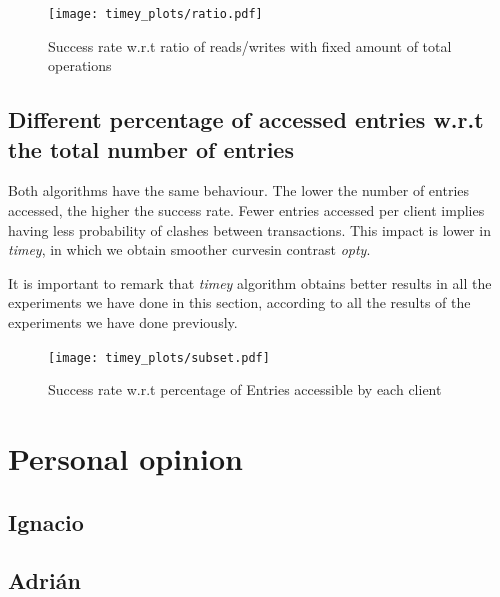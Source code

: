 \documentclass[a4paper, 10pt]{article}
\begin{document}
\begin{figure}[H]
  \centering
  \texttt{[image: timey\_plots/ratio.pdf]}
    \caption{Success rate w.r.t ratio of reads/writes with fixed amount of total operations}
    \label{timey:ratio}
\end{figure} 

\clearpage
\subsection{Different percentage of accessed entries w.r.t the total number of entries}

Both algorithms have the same behaviour. The lower the number of entries accessed, the higher the success rate. Fewer entries accessed per client implies having less probability of clashes between transactions. This impact is lower in \textit{timey}, in which we obtain smoother curvesin contrast \textit{opty}.

It is important to remark that \textit{timey} algorithm obtains better results in all the experiments we have done in this section, according to all the results of the experiments we have done previously.

\begin{figure}[H]
  \centering
  \texttt{[image: timey\_plots/subset.pdf]}
    \caption{Success rate w.r.t percentage of Entries accessible by each client}
    \label{timey:subset}
\end{figure} 

\clearpage
\section{Personal opinion}

\subsection{Ignacio}

\subsection{Adrián}
\end{document}
